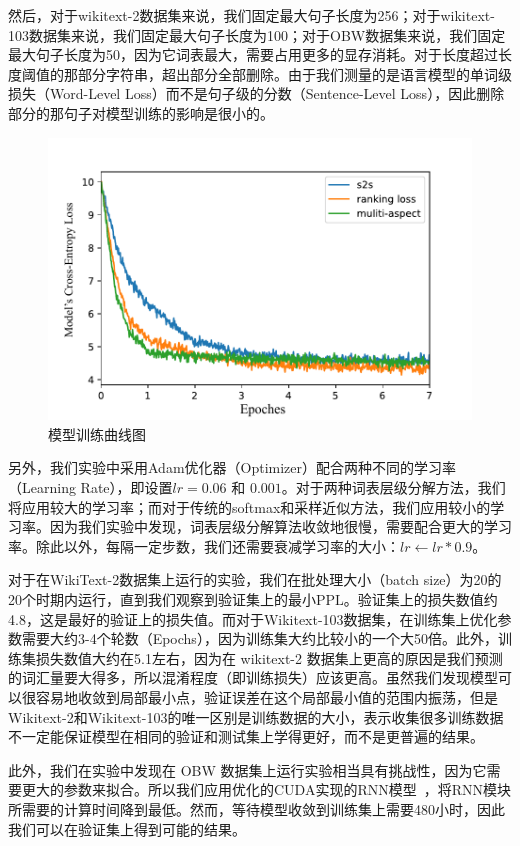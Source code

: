 然后，对于wikitext-2数据集来说，我们固定最大句子长度为256；对于wikitext-103数据集来说，我们固定最大句子长度为100；对于OBW数据集来说，我们固定最大句子长度为50，因为它词表最大，需要占用更多的显存消耗。对于长度超过长度阈值的那部分字符串，超出部分全部删除。由于我们测量的是语言模型的单词级损失（Word-Level Loss）而不是句子级的分数（Sentence-Level Loss），因此删除部分的那句子对模型训练的影响是很小的。
\begin{figure}[!t]
  \centering
  \includegraphics[width=0.6\columnwidth]{./figures/learn2.pdf}
  \caption{模型训练曲线图}
\end{figure}

另外，我们实验中采用Adam优化器（Optimizer）配合两种不同的学习率（Learning Rate），即设置$ lr = 0.06$ 和 $0.001 $。对于两种词表层级分解方法，我们将应用较大的学习率；而对于传统的softmax和采样近似方法，我们应用较小的学习率。因为我们实验中发现，词表层级分解算法收敛地很慢，需要配合更大的学习率。除此以外，每隔一定步数，我们还需要衰减学习率的大小：$lr \leftarrow lr *0.9$。

对于在WikiText-2数据集上运行的实验，我们在批处理大小（batch size）为20的20个时期内运行，直到我们观察到验证集上的最小$ \mathrm{PPL} $。验证集上的损失数值约4.8，这是最好的验证上的损失值。而对于Wikitext-103数据集，在训练集上优化参数需要大约3-4个轮数（Epochs），因为训练集大约比较小的一个大50倍。此外，训练集损失数值大约在5.1左右，因为在 wikitext-2 数据集上更高的原因是我们预测的词汇量要大得多，所以混淆程度（即训练损失）应该更高。虽然我们发现模型可以很容易地收敛到局部最小点，验证误差在这个局部最小值的范围内振荡，但是Wikitext-2和Wikitext-103的唯一区别是训练数据的大小，表示收集很多训练数据不一定能保证模型在相同的验证和测试集上学得更好，而不是更普遍的结果。

此外，我们在实验中发现在 OBW 数据集上运行实验相当具有挑战性，因为它需要更大的参数来拟合。所以我们应用优化的CUDA实现的RNN模型~，将RNN模块所需要的计算时间降到最低。然而，等待模型收敛到训练集上需要480小时，因此我们可以在验证集上得到可能的结果。

